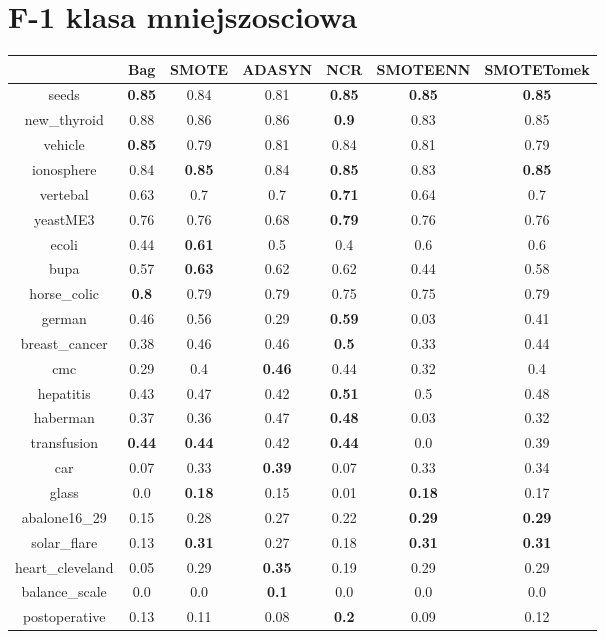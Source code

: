 \documentclass{article}%
\begin{document}
\section*{F{-}1 klasa mniejszosciowa}%
\begin{tabular}{c|cccccc}%
&Bag&SMOTE&ADASYN&NCR&SMOTEENN&SMOTETomek\\%
\hline%
seeds&\textbf{0.85}&0.84&0.81&\textbf{0.85}&\textbf{0.85}&\textbf{0.85}\\%
new\_thyroid&0.88&0.86&0.86&\textbf{0.9}&0.83&0.85\\%
vehicle&\textbf{0.85}&0.79&0.81&0.84&0.81&0.79\\%
ionosphere&0.84&\textbf{0.85}&0.84&\textbf{0.85}&0.83&\textbf{0.85}\\%
vertebal&0.63&0.7&0.7&\textbf{0.71}&0.64&0.7\\%
yeastME3&0.76&0.76&0.68&\textbf{0.79}&0.76&0.76\\%
ecoli&0.44&\textbf{0.61}&0.5&0.4&0.6&0.6\\%
bupa&0.57&\textbf{0.63}&0.62&0.62&0.44&0.58\\%
horse\_colic&\textbf{0.8}&0.79&0.79&0.75&0.75&0.79\\%
german&0.46&0.56&0.29&\textbf{0.59}&0.03&0.41\\%
breast\_cancer&0.38&0.46&0.46&\textbf{0.5}&0.33&0.44\\%
cmc&0.29&0.4&\textbf{0.46}&0.44&0.32&0.4\\%
hepatitis&0.43&0.47&0.42&\textbf{0.51}&0.5&0.48\\%
haberman&0.37&0.36&0.47&\textbf{0.48}&0.03&0.32\\%
transfusion&\textbf{0.44}&\textbf{0.44}&0.42&\textbf{0.44}&0.0&0.39\\%
car&0.07&0.33&\textbf{0.39}&0.07&0.33&0.34\\%
glass&0.0&\textbf{0.18}&0.15&0.01&\textbf{0.18}&0.17\\%
abalone16\_29&0.15&0.28&0.27&0.22&\textbf{0.29}&\textbf{0.29}\\%
solar\_flare&0.13&\textbf{0.31}&0.27&0.18&\textbf{0.31}&\textbf{0.31}\\%
heart\_cleveland&0.05&0.29&\textbf{0.35}&0.19&0.29&0.29\\%
balance\_scale&0.0&0.0&\textbf{0.1}&0.0&0.0&0.0\\%
postoperative&0.13&0.11&0.08&\textbf{0.2}&0.09&0.12\\%
\end{tabular}

%
\end{document}
